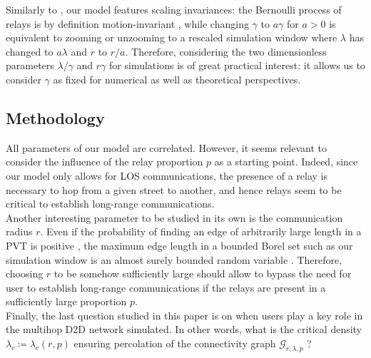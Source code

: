 \documentclass[conference]{IEEEtran}
\begin{document}
\indent Similarly to \cite{cali2018percolation}, our model features scaling invariances: the Bernoulli process of relays is by definition motion-invariant \cite{blaszczyszyn_stochastic_2018}, while changing $\gamma$ to $a\gamma$ for $a>0$ is equivalent to zooming or unzooming to a rescaled simulation window where $\lambda$ has changed to $a\lambda$ and $r$ to $r/a$. Therefore, considering the two dimensionless parameters $\lambda / \gamma$ and $r\gamma$ for simulations is of great practical interest: it allows us to consider $\gamma$ as fixed for numerical as well as theoretical perspectives.  %

\subsection{Methodology}
All parameters of our model are correlated. However, it seems relevant to  consider the influence of the relay proportion $p$ as a starting point. Indeed, since our model only allows for LOS communications, the presence of a relay is necessary to hop from a given street to another, and hence relays seem to be critical to establish long-range communications. \\
\indent Another interesting parameter to be studied in its own is the communication radius $r$. Even if the probability of finding an edge of arbitrarily large length in a PVT is positive \cite{okabe_spatial_1992}, the maximum edge length in a bounded Borel set such as our simulation window is an almost surely bounded random variable \cite{chiu_stochastic_2013}. Therefore, choosing $r$ to be somehow sufficiently large should allow to bypass the need for user to establish long-range communications if the relays are present in a sufficiently large proportion $p$. \\
\indent Finally, the last question studied in this paper is on when users play a key role in the multihop D2D network simulated. In other words, what is the critical density \cite{meester_continuum_1996} $\lambda_{c} \coloneqq \lambda_{c}(r,p)$ ensuring percolation of the connectivity graph $\mathcal{G}_{r,\lambda,p}$ ?
\end{document}
